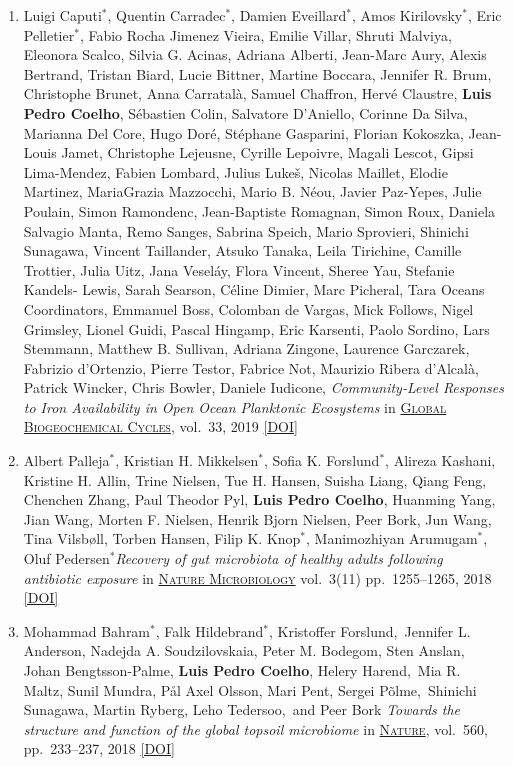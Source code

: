 \documentclass{article}
\newcommand\showdoi[1]{%
    \href{http://dx.doi.org/#1}{[DOI]}%
}
\newcommand\pubname[1]{\textsc{\uline{#1}}}
\newcommand\contribution[1]{\relax}
\newcommand\costar{${}^{*}$}
\begin{document}
\begin{enumerate}[resume]
\item Luigi Caputi\costar, Quentin Carradec\costar, Damien Eveillard\costar,
Amos Kirilovsky\costar, Eric Pelletier\costar, Fabio Rocha Jimenez Vieira,
Emilie Villar, Shruti Malviya, Eleonora Scalco, Silvia G. Acinas, Adriana
Alberti, Jean-Marc Aury, Alexis Bertrand, Tristan Biard, Lucie Bittner, Martine
Boccara, Jennifer R. Brum, Christophe Brunet, Anna Carratalà, Samuel Chaffron,
Hervé Claustre, \textbf{Luis Pedro Coelho}, Sébastien Colin, Salvatore
D'Aniello, Corinne Da Silva, Marianna Del Core, Hugo Doré, Stéphane Gasparini,
Florian Kokoszka, Jean-Louis Jamet, Christophe Lejeusne, Cyrille Lepoivre,
Magali Lescot, Gipsi Lima-Mendez, Fabien Lombard, Julius Lukeš, Nicolas
Maillet, Elodie Martinez, MariaGrazia Mazzocchi, Mario B. Néou, Javier
Paz-Yepes, Julie Poulain, Simon Ramondenc, Jean-Baptiste Romagnan, Simon Roux,
Daniela Salvagio Manta, Remo Sanges, Sabrina Speich, Mario Sprovieri, Shinichi
Sunagawa, Vincent Taillander, Atsuko Tanaka, Leila Tirichine, Camille Trottier,
Julia Uitz, Jana Veseláy, Flora Vincent, Sheree Yau, Stefanie Kandels- Lewis,
Sarah Searson, Céline Dimier, Marc Picheral, Tara Oceans Coordinators, Emmanuel
Boss, Colomban de Vargas, Mick Follows, Nigel Grimsley, Lionel Guidi, Pascal
Hingamp, Eric Karsenti, Paolo Sordino, Lars Stemmann, Matthew B. Sullivan,
Adriana Zingone, Laurence Garczarek, Fabrizio d'Ortenzio, Pierre Testor,
Fabrice Not, Maurizio Ribera d'Alcalà, Patrick Wincker, Chris Bowler, Daniele
Iudicone, \emph{Community‐Level Responses to Iron Availability in Open Ocean
Planktonic Ecosystems} in \pubname{Global Biogeochemical Cycles}, vol.\ 33,
2019 \showdoi{10.1029/2018GB006022}
\contribution{I contributed to data analysis (of metatranscriptomics and
imaging data).}

\item Albert Palleja\costar, Kristian H. Mikkelsen\costar, Sofia K.
Forslund\costar, Alireza Kashani, Kristine H. Allin, Trine Nielsen, Tue H.
Hansen, Suisha Liang, Qiang Feng, Chenchen Zhang, Paul Theodor Pyl,
\textbf{Luis Pedro Coelho}, Huanming Yang, Jian Wang, Morten F. Nielsen, Henrik
Bjorn Nielsen, Peer Bork, Jun Wang, Tina Vilsbøll, Torben Hansen, Filip K.
Knop\costar, Manimozhiyan Arumugam\costar, Oluf Pedersen\costar \emph{Recovery
of gut microbiota of healthy adults following antibiotic exposure} in
\pubname{Nature Microbiology} vol.\ 3(11) pp.\ 1255--1265, 2018
\showdoi{10.1038/s41564-018-0257-9}
\contribution{I performed statistical analyses of the microbiome data.}

\item Mohammad Bahram\costar, Falk Hildebrand\costar, Kristoffer
Forslund, Jennifer L. Anderson, Nadejda A. Soudzilovskaia, Peter M. Bodegom,
Sten Anslan, Johan Bengtsson-Palme, \textbf{Luis Pedro Coelho}, Helery
Harend, Mia R. Maltz, Sunil Mundra, Pål Axel Olsson, Mari Pent, Sergei
Põlme, Shinichi Sunagawa, Martin Ryberg, Leho Tedersoo, and Peer Bork
\emph{Towards the structure and function of the global topsoil microbiome} in
\pubname{Nature}, vol.\ 560, pp.\ 233--237, 2018
\showdoi{10.1038/s41586-018-0386-6}
\contribution{I contributed to the analysis of metagenomics data, in particular
building a gene catalogue of the soil microbiome.}


\end{enumerate}
\end{document}

